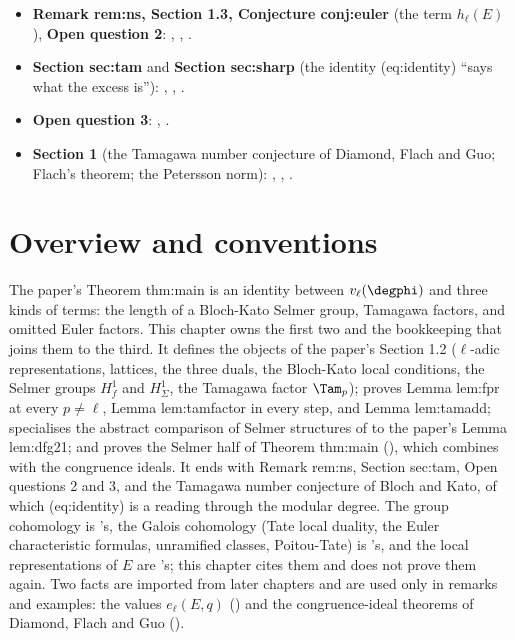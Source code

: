 \begin{itemize}
\item \textbf{Remark rem:ns, Section 1.3, Conjecture conj:euler} (the term $h_\ell(E)$), \textbf{Open question 2}: , ,
.
\item \textbf{Section sec:tam} and \textbf{Section sec:sharp} (the identity (eq:identity) ``says what the excess is''): , ,
.
\item \textbf{Open question 3}: , .
\item \textbf{Section 1} (the Tamagawa number conjecture of Diamond, Flach and Guo; Flach's theorem; the Petersson norm): , ,
.
\end{itemize}

\section{Overview and conventions}\label{sec:blochkato:overview}

The paper's Theorem thm:main is an identity between $v_\ell(\degphi)$ and three kinds of terms: the length of a Bloch-Kato Selmer
group, Tamagawa factors, and omitted Euler factors. This chapter owns the first two and the bookkeeping that joins them to the
third. It defines the objects of the paper's Section 1.2 ($\ell$-adic representations, lattices, the three duals, the Bloch-Kato local
conditions, the Selmer groups $H^1_f$ and $H^1_\Sigma$, the Tamagawa factor $\Tam_p$); proves Lemma lem:fpr at every $p\ne\ell$, Lemma
lem:tamfactor in every step, and Lemma lem:tamadd; specialises the abstract comparison of Selmer structures of  to the
paper's Lemma lem:dfg21; and proves the Selmer half of Theorem thm:main (), which
 combines with the congruence ideals. It ends with Remark rem:ns, Section sec:tam, Open questions 2 and 3, and the
Tamagawa number conjecture of Bloch and Kato, of which (eq:identity) is a reading through the modular degree. The group cohomology
is 's, the Galois cohomology (Tate local duality, the Euler characteristic formulas, unramified classes,
Poitou-Tate) is 's, and the local representations of $E$ are 's; this chapter cites them and does not
prove them again. Two facts are imported from later chapters and are used only in remarks and examples: the values $e_\ell(E,q)$
() and the congruence-ideal theorems of Diamond, Flach and Guo ().

